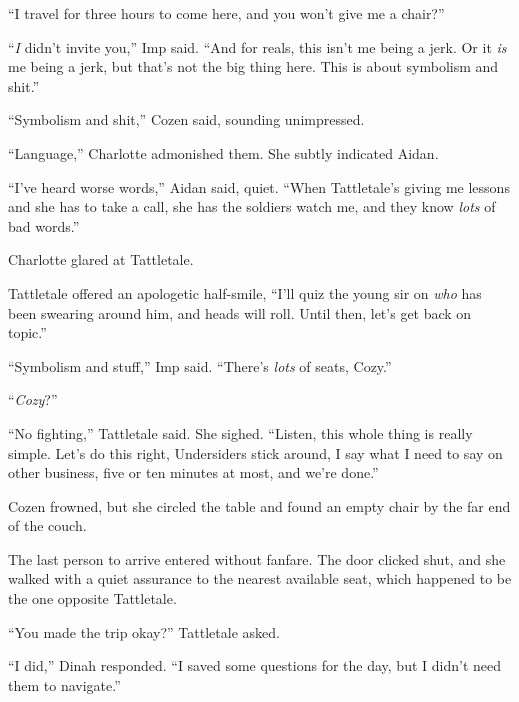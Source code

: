 ``I travel for three hours to come here, and you won't give me a chair?''



``\emph{I} didn't invite you,'' Imp said.  ``And for reals, this isn't me being a jerk.  Or it \emph{is} me being a jerk, but that's not the big thing here.  This is about symbolism and shit.''



``Symbolism and shit,'' Cozen said, sounding unimpressed.



``Language,'' Charlotte admonished them.  She subtly indicated Aidan.



``I've heard worse words,'' Aidan said, quiet.  ``When Tattletale's giving me lessons and she has to take a call, she has the soldiers watch me, and they know \emph{lots} of bad words.''



Charlotte glared at Tattletale.



Tattletale offered an apologetic half-smile, ``I'll quiz the young sir on \emph{who} has been swearing around him, and heads will roll.  Until then, let's get back on topic.''



``Symbolism and stuff,'' Imp said.  ``There's \emph{lots} of seats, Cozy.''



``\emph{Cozy}?''



``No fighting,'' Tattletale said.  She sighed.  ``Listen, this whole thing is really simple.  Let's do this right, Undersiders stick around, I say what I need to say on other business, five or ten minutes at most, and we're done.''



Cozen frowned, but she circled the table and found an empty chair by the far end of the couch.



The last person to arrive entered without fanfare.  The door clicked shut, and she walked with a quiet assurance to the nearest available seat, which happened to be the one opposite Tattletale.



``You made the trip okay?'' Tattletale asked.



``I did,'' Dinah responded.  ``I saved some questions for the day, but I didn't need them to navigate.''



